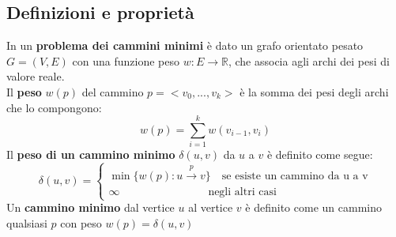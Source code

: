 \subsection{Definizioni e proprietà}
In un \textbf{problema dei cammini minimi} è dato un grafo orientato pesato $G=(V, E)$ con una funzione peso $w: E \rightarrow \mathbb{R}$, che associa agli archi dei pesi di valore reale.\\
Il \textbf{peso} $w(p)$ del cammino $p = <v_0, ..., v_k>$ è la somma dei pesi degli archi che lo compongono:
    \begin{equation}
        w(p) = \sum_{i = 1}^{k} w(v_{i-1}, v_i)
    \end{equation}
Il \textbf{peso di un cammino minimo} $\delta(u,v)$ da $u$ a $v$ è definito come segue:
    \begin{equation}
        \delta(u,v) = 
        \begin{cases}
            \min\{w(p): u \xrightarrow{p} v\} \quad \text{se esiste un cammino da u a v}\\
            \infty \qquad \qquad \qquad \qquad \text{negli altri casi}
        \end{cases}
    \end{equation}
Un \textbf{cammino minimo} dal vertice $u$ al vertice $v$ è definito come un cammino qualsiasi $p$ con peso $w(p) = \delta(u,v)$

